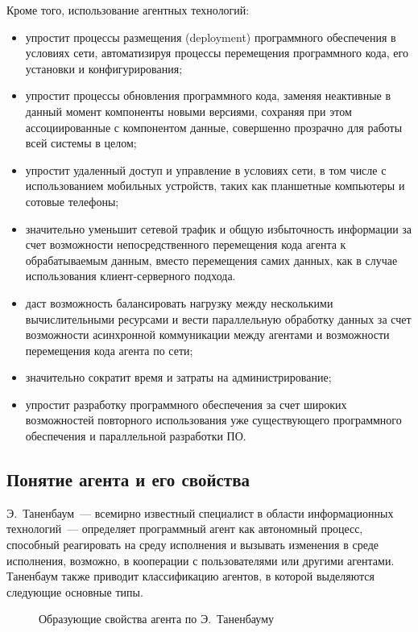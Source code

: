 Кроме того, использование агентных технологий:
\begin{itemize}
\item упростит процессы размещения (deployment) программного обеспечения в условиях сети, автоматизируя процессы перемещения программного кода, его установки и конфигурирования;
\item упростит процессы обновления программного кода, заменяя неактивные в данный момент компоненты новыми версиями, сохраняя при этом ассоциированные с компонентом данные, совершенно прозрачно для работы всей системы в целом;
\item упростит удаленный доступ и управление в условиях сети, в том числе с использованием мобильных устройств, таких как планшетные компьютеры и сотовые телефоны;
\item значительно уменьшит сетевой трафик и общую избыточность информации за счет возможности непосредственного перемещения кода агента к обрабатываемым данным, вместо перемещения самих данных, как в случае использования клиент-серверного подхода.
\item даст возможность балансировать нагрузку между несколькими вычислительными ресурсами и вести параллельную обработку данных за счет возможности асинхронной коммуникации между агентами и возможности перемещения кода агента по сети;
\item значительно сократит время и затраты на администрирование;
\item упростит разработку программного обеспечения за счет широких возможностей повторного использования уже существующего программного обеспечения и параллельной разработки ПО.
\end{itemize}

\subsection{Понятие агента и его свойства}
Э.~Таненбаум~--- всемирно известный специалист в области информационных технологий~--- определяет программный агент как автономный процесс, способный реагировать на среду исполнения и вызывать изменения в среде исполнения, возможно, в кооперации с пользователями или другими агентами. Таненбаум также приводит классификацию агентов, в которой выделяются следующие основные типы.
\begin{figure}[h]
\caption{Образующие свойства агента по Э.~Таненбауму}
\label{1:tanenbaum-agent}
\end{figure}

